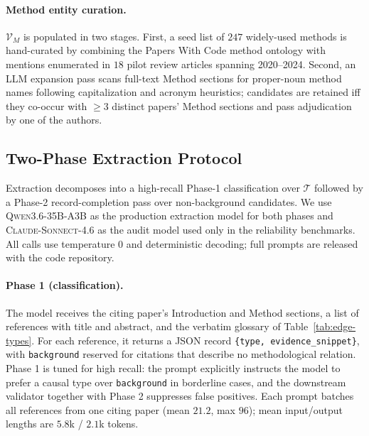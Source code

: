 \documentclass{opendatalab}
\begin{document}
\paragraph{Method entity curation.}
$\mathcal{V}_M$ is populated in two stages. First, a seed list of $247$ widely-used methods is hand-curated by
combining the Papers With Code method ontology with mentions enumerated in $18$ pilot review articles spanning
2020--2024. Second, an LLM expansion pass scans full-text Method sections for proper-noun method names following
capitalization and acronym heuristics; candidates are retained iff they co-occur with $\ge 3$ distinct papers'
Method sections and pass adjudication by one of the authors.


\subsection{Two-Phase Extraction Protocol}
\label{app:extraction}

Extraction decomposes into a high-recall Phase-1 classification over $\mathcal{T}$ followed by a Phase-2
record-completion pass over non-background candidates. We use \textsc{Qwen3.6-35B-A3B} as the production
extraction model for both phases and \textsc{Claude-Sonnect-4.6} as the audit model used only in the reliability
benchmarks. All calls use temperature $0$ and deterministic decoding; full prompts are released with the code
repository.

\paragraph{Phase 1 (classification).}
The model receives the citing paper's Introduction and Method sections, a list of references with title and
abstract, and the verbatim glossary of Table~\ref{tab:edge-types}. For each reference, it returns a JSON record
\texttt{\{type, evidence\_snippet\}}, with \texttt{background} reserved for citations that describe no
methodological relation. Phase 1 is tuned for high recall: the prompt explicitly instructs the model to prefer a
causal type over \texttt{background} in borderline cases, and the downstream validator together with Phase 2
suppresses false positives. Each prompt batches all references from one citing paper (mean $21.2$, max $96$); mean
input/output lengths are $5.8$k / $2.1$k tokens.
\end{document}
